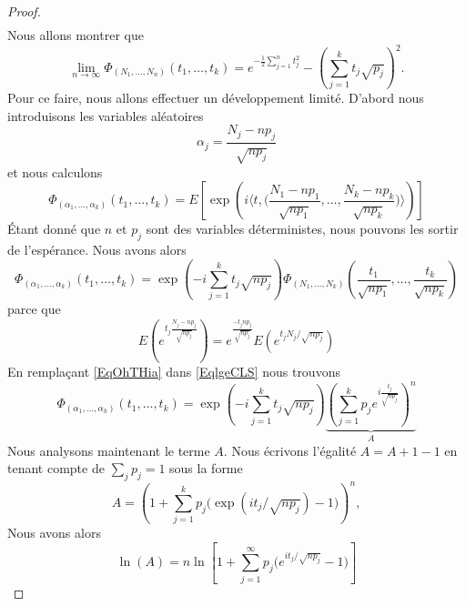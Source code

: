 \begin{proof}
\begin{subequations}
\begin{align}
		\end{align}
	\end{subequations}
	Nous allons montrer que
	\begin{equation}
		\lim_{n\to \infty} \Phi_{(N_1,\ldots, N_n)}(t_1,\ldots, t_k)= e^{-\frac{ 1 }{2}\sum_{j=1}^nt_j^2}-\left( \sum_{j=1}^kt_j\sqrt{p_j} \right)^2.
	\end{equation}
	Pour ce faire, nous allons effectuer un développement limité. D'abord nous introduisons les variables aléatoires
	\begin{equation}        \label{EqmdROCD}
		\alpha_j=\frac{ N_j-np_j }{ \sqrt{np_j} }
	\end{equation}
	et nous calculons
	\begin{equation}
		\Phi_{(\alpha_1,\ldots, \alpha_k)}(t_1,\ldots, t_k)=E\left[ \exp\left( i\langle t, \big( \frac{ N_1-np_1 }{ \sqrt{np_1} },\ldots, \frac{ N_k-np_k }{ \sqrt{np_k} } \big)\rangle  \right) \right]
	\end{equation}
	Étant donné que \( n\) et \( p_j\) sont des variables déterministes, nous pouvons les sortir de l'espérance. Nous avons alors
	\begin{equation}        \label{EqlgeCLS}
		\Phi_{(\alpha_1,\ldots, \alpha_k)}(t_1,\ldots, t_k)= \exp\left( -i\sum_{j=1}^kt_j\sqrt{np_j} \right)\Phi_{(N_1,\ldots, N_k)}\left( \frac{ t_1 }{ \sqrt{np_1} },\ldots, \frac{ t_k }{ \sqrt{np_k} } \right)
	\end{equation}
	parce que
	\begin{equation}
		E\left(  e^{t_j\frac{ N_j-np_j }{ \sqrt{np_j} }} \right)= e^{\frac{ -t_jnp_j }{ \sqrt{np_j} }}E\left(  e^{t_jN_j/\sqrt{np_j}} \right)
	\end{equation}
	En remplaçant \eqref{EqOhTHia} dans \eqref{EqlgeCLS} nous trouvons
	\begin{equation}        \label{EqrUYsnD}
		\Phi_{(\alpha_1,\ldots, \alpha_k)}(t_1,\ldots, t_k)=\exp\left( -i\sum_{j=1}^kt_j\sqrt{np_j} \right)\underbrace{\left( \sum_{j=1}^kp_j e^{i\frac{ t_j }{ \sqrt{np_j} }} \right)^n}_{A}
	\end{equation}
	Nous analysons maintenant le terme \( A\). Nous écrivons l'égalité \( A=A+1-1\) en tenant compte de \( \sum_{j}p_j=1\) sous la forme
	\begin{equation}
		A=\left( 1+\sum_{j=1}^kp_j\big( \exp(it_j/\sqrt{np_j})-1 \big) \right)^n,
	\end{equation}
	Nous avons alors
	\begin{equation}
		\ln(A)=n\ln\left[ 1+\sum_{j=1}^{\infty}p_j\big( e^{ it_j/\sqrt{np_j}}-1) \right]

\end{equation}
\end{proof}
